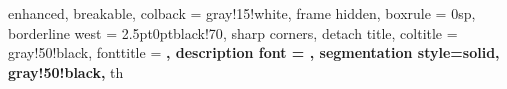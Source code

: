 
{%
	enhanced,
	breakable,
	colback = gray!15!white,
	frame hidden,
	boxrule = 0sp,
	borderline west = {2.5pt}{0pt}{black!70},
	sharp corners,
	detach title,
	coltitle = gray!50!black,
	fonttitle = \bfseries\sffamily,
	description font = \mdseries,
	segmentation style={solid, gray!50!black},
}
{th}





\newcommand{\boxfr}[1]{
	\begin{tcolorbox}[
	drop shadow southeast,
	enhanced,
	colframe=black!50,
	colback=white,
	boxrule = 1pt, 
	boxsep=5pt,
	arc=1pt,
	]
	\begin{center}
	#1
	\end{center}
	\end{tcolorbox}
}
